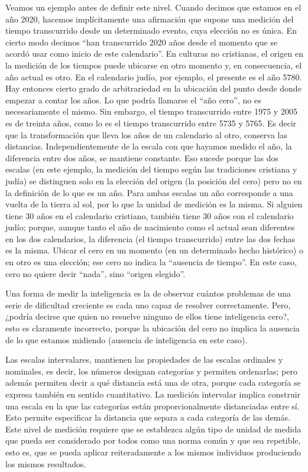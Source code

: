 \documentclass[]{book}
\begin{document}
Veamos un ejemplo antes de definir este nivel. Cuando decimos que estamos en el año 2020, hacemos implícitamente una afirmación que supone una medición del tiempo transcurrido desde un determinado evento, cuya elección no es única. En cierto modo decimos ``han transcurrido 2020 años desde el momento que se acordó usar como inicio de este calendario''. En culturas no cristianas, el origen en la medición de los tiempos puede ubicarse en otro momento y, en consecuencia, el año actual es otro. En el calendario judío, por ejemplo, el presente es el año 5780. Hay entonces cierto grado de arbitrariedad en la ubicación del punto desde donde empezar a contar los años. Lo que podría llamarse el ``año cero'', no es necesariamente el mismo. Sin embargo, el tiempo transcurrido entre 1975 y 2005 es de treinta años, como lo es el tiempo transcurrido entre 5735 y 5765. Es decir que la transformación que lleva los años de un calendario al otro, conserva las distancias. Independientemente de la escala con que hayamos medido el año, la diferencia entre dos años, se mantiene constante. Eso sucede porque las dos escalas (en este ejemplo, la medición del tiempo según las tradiciones cristiana y judía) se distinguen solo en la elección del origen (la posición del cero) pero no en la definición de lo que es un año. Para ambas escalas un año corresponde a una vuelta de la tierra al sol, por lo que la unidad de medición es la misma. Si alguien tiene 30 años en el calendario cristiano, también tiene 30 años con el calendario judío; porque, aunque tanto el año de nacimiento como el actual sean diferentes en los dos calendarios, la diferencia (el tiempo transcurrido) entre las dos fechas es la misma. Ubicar el cero en un momento (en un determinado hecho histórico) o en otro es una elección; ese cero no indica la ``ausencia de tiempo''. En este caso, cero no quiere decir ``nada'', sino ``origen elegido''.

Una forma de medir la inteligencia es la de observar cuántos problemas de una serie de dificultad creciente es cada uno capaz de resolver correctamente. Pero, ¿podría decirse que quien no resuelve ninguno de ellos tiene inteligencia cero?, esto es claramente incorrecto, porque la ubicación del cero no implica la ausencia de lo que estamos midiendo (ausencia de inteligencia en este caso).

Las escalas intervalares, mantienen las propiedades de las escalas ordinales y nominales, es decir, los números designan categorías y permiten ordenarlas; pero además permiten decir a qué distancia está una de otra, porque cada categoría se expresa también en sentido cuantitativo. La medición intervalar implica construir una escala en la que las categorías están proporcionalmente distanciadas entre sí. Esto permite especificar la distancia que separa a cada categoría de las demás. Este nivel de medición requiere que se establezca algún tipo de unidad de medida que pueda ser considerado por todos como una norma común y que sea repetible, esto es, que se pueda aplicar reiteradamente a los mismos individuos produciendo los mismos resultados.
\end{document}
